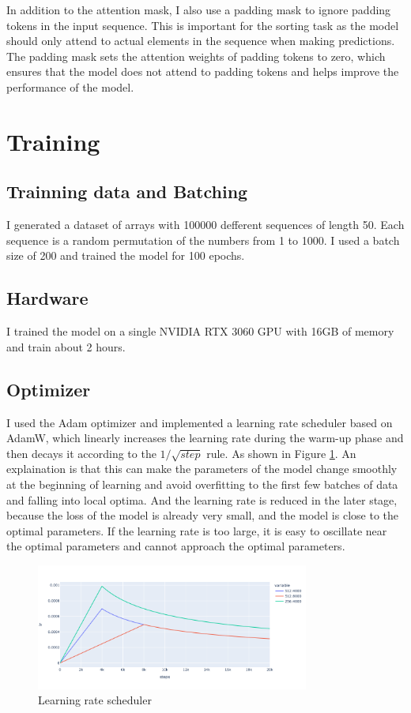 \documentclass{article}
\begin{document}
In addition to the attention mask, I also use a padding mask to ignore padding tokens in the input sequence. This is important for the sorting task as the model should only attend to actual elements in the sequence when making predictions. The padding mask sets the attention weights of padding tokens to zero, which ensures that the model does not attend to padding tokens and helps improve the performance of the model.


\section{Training}
\subsection{Trainning data and Batching}
I generated a dataset of arrays with 100000 defferent sequences of length 50. Each sequence is a random permutation of the numbers from 1 to 1000. I used a batch size of 200 and trained the model for 100 epochs.

\subsection{Hardware}
I trained the model on a single NVIDIA RTX 3060 GPU with 16GB of memory and train about 2 hours.

\subsection{Optimizer}
I used the Adam optimizer and implemented a learning rate scheduler based on AdamW, which linearly increases the learning rate during the warm-up phase and then decays it according to the $1/\sqrt{step}$ rule. As shown in Figure \ref{Learning rate scheduler}. An explaination \cite{Opt} is that this can make the parameters of the model change smoothly at the beginning of learning and avoid overfitting to the first few batches of data and falling into local optima. And the learning rate is reduced in the later stage, because the loss of the model is already very small, and the model is close to the optimal parameters. If the learning rate is too large, it is easy to oscillate near the optimal parameters and cannot approach the optimal parameters. 

\begin{figure}
    \centering
    \includegraphics[width=0.8\textwidth]
    {picture/optimizer.png}
    \caption{Learning rate scheduler}
    \label{Learning rate scheduler}
\end{figure}
\end{document}
